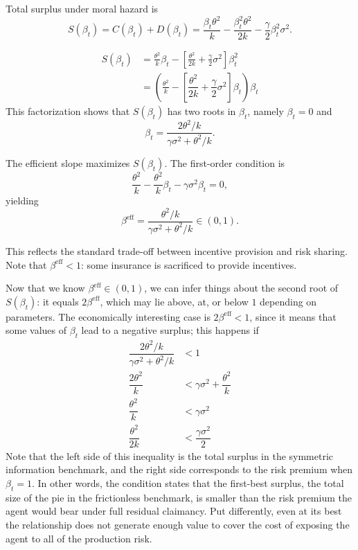 \documentclass{article}
\theoremstyle{definition}
\theoremstyle{plain}
\begin{document}
Total surplus under moral hazard is
\[
S(\beta_t) = C(\beta_t) + D(\beta_t) = \frac{\beta_t \theta^2}{k} - \frac{\beta_t^2 \theta^2}{2k} - \frac{\gamma}{2}\beta_t^2 \sigma^2.
\]

\begin{align*}
    S(\beta_t) &= \frac{ \theta^2}{k} \beta_t -\left[ \frac{ \theta^2}{2k} + \frac{\gamma}{2} \sigma^2\right]\beta_t^2\\
    &=\left(\frac{\theta^2}{k} -\left[\dfrac{\theta^2}{2k}+\dfrac{\gamma}{2}\sigma^2 \right]\beta_t \right)\beta_t
\end{align*}
This factorization shows that $S(\beta_t)$ has two roots in $\beta_t$, namely $\beta_t = 0$ and 
\[
    \beta_t=\dfrac{2\theta^2/k}{\gamma\sigma^2+\theta^2/k}.
\]

The efficient slope maximizes $S(\beta_t)$. The first-order condition is
\[
\frac{\theta^2}{k} - \frac{\theta^2}{k} \beta_t - \gamma \sigma^2 \beta_t = 0,
\]
yielding
\[
\beta^{\text{eff}} = \frac{\theta^2/k}{\gamma \sigma^2 + \theta^2/k} \in (0,1).
\]

This reflects the standard trade-off between incentive provision and risk sharing. Note that $\beta^{\text{eff}} < 1$: some insurance is sacrificed to provide incentives.

Now that we know $\beta^{\text{eff}}\in (0,1)$, we can infer things about the second root of $S(\beta_t)$: it equals $2\beta^{\text{eff}}$, which may lie above, at, or below $1$ depending on parameters. The economically interesting case is $2\beta^{\text{eff}}<1$, since it means that some values of $\beta_t$ lead to a negative surplus; this happens if
\begin{align*}
    \dfrac{2\theta^2/k}{\gamma\sigma^2+\theta^2/k}&<1\\
    \dfrac{2\theta^2}{k}&<\gamma\sigma^2+\dfrac{\theta^2}{k}\\
    \dfrac{\theta^2}{k}&<\gamma\sigma^2\\
    \dfrac{\theta^2}{2k}&<\dfrac{\gamma\sigma^2}{2}
\end{align*}
Note that the left side of this inequality is the total surplus in the symmetric information benchmark, and the right side corresponds to the risk premium when $\beta_t=1$. In other words, the condition states that the first-best surplus, the total size of the pie in the frictionless benchmark, is smaller than the risk premium the agent would bear under full residual claimancy. Put differently, even at its best the relationship does not generate enough value to cover the cost of exposing the agent to all of the production risk.
\end{document}
